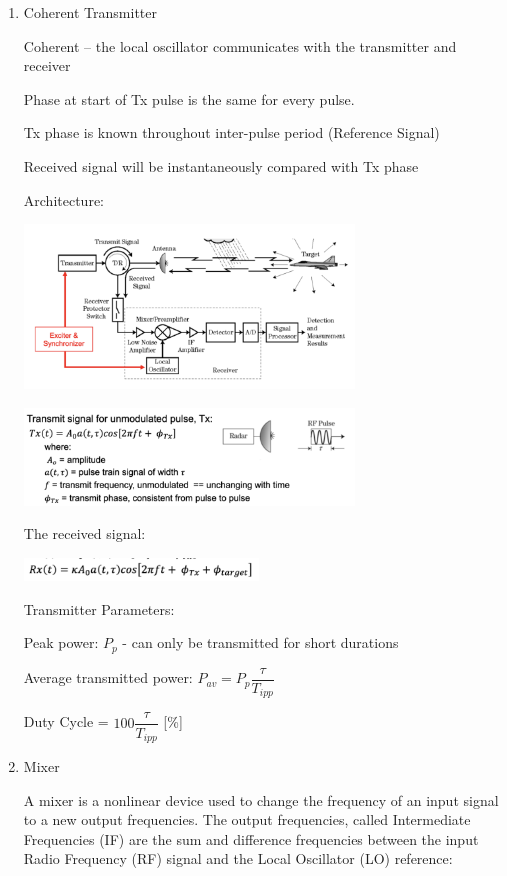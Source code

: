 \documentclass[10pt]{article}
\renewcommand{\frac}{\dfrac}
\begin{document}
\begin{enumerate}


\item{Coherent Transmitter}

Coherent – the local oscillator communicates with
the transmitter and receiver

Phase at start of Tx pulse is the same for every pulse.

Tx phase is known throughout inter-pulse period (Reference Signal)

Received signal will be instantaneously compared with Tx phase

Architecture:

\includegraphics[width=0.69\textwidth]{figs/coherent_trans_architecture.png}


\includegraphics[width=0.69\textwidth]{figs/coherent_tx_signal.png}

The received signal:

\includegraphics[width=0.49\textwidth]{figs/coherent_rx_signal.png}

Transmitter Parameters:

Peak power: $P_p$ - can only be transmitted for short durations

Average transmitted power: $P_{av} = P_p \frac{\tau}{T_{ipp}}$


Duty Cycle = $ 100 \frac{\tau}{T_{ipp}}$ [\%]


\item{Mixer}

A mixer is a nonlinear device used to change the frequency of an input
signal to a new output frequencies.
The output frequencies, called Intermediate Frequencies (IF) are the sum
and difference frequencies between the input Radio Frequency (RF) signal
and the Local Oscillator (LO) reference:


\end{enumerate}
\end{document}
